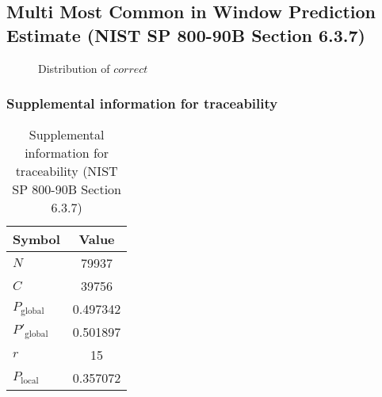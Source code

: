 \documentclass[a3paper,xelatex,english]{bxjsarticle}
\begin{document}
\subsection{Multi Most Common in Window Prediction Estimate (NIST SP 800-90B Section 6.3.7)}
\begin{figure}[htbp]
\centering

\caption{Distribution of $correct$}
\end{figure}
\subsubsection{Supplemental information for traceability}
\renewcommand{\arraystretch}{1.8}
\begin{table}[h]
\caption{Supplemental information for traceability (NIST SP 800-90B Section 6.3.7)}
\begin{center}
\begin{tabular}{|l|c|}
\hline 
\rowcolor{anotherlightblue} %
Symbol				& Value \\ \hline 
$N$				& 79937\\ \hline 
$C$				& 39756\\ \hline 
$P_{\textrm{global}}$				& 0.497342\\ \hline 
$P'_{\textrm{global}}$			& 0.501897\\ \hline 
$r$				& 15\\ \hline 
$P_{\textrm{local}}$ 			& 0.357072\\ \hline
\end{tabular}
\end{center}
\end{table}
\renewcommand{\arraystretch}{1.4}
\clearpage
\end{document}
